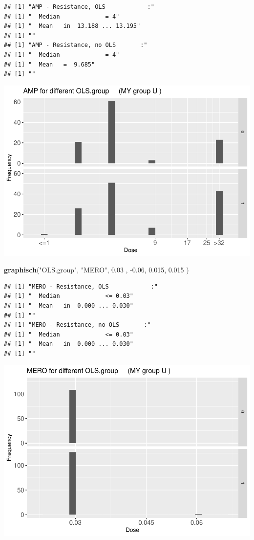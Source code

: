 \documentclass[
]{article}
\newenvironment{Shaded}{\begin{snugshade}}{\end{snugshade}}
\newcommand{\FloatTok}[1]{\textcolor[rgb]{0.00,0.00,0.81}{#1}}
\newcommand{\KeywordTok}[1]{\textcolor[rgb]{0.13,0.29,0.53}{\textbf{#1}}}
\newcommand{\NormalTok}[1]{#1}
\newcommand{\StringTok}[1]{\textcolor[rgb]{0.31,0.60,0.02}{#1}}
\begin{document}
\begin{verbatim}
## [1] "AMP - Resistance, OLS            :"
## [1] "  Median             = 4"
## [1] "  Mean   in  13.188 ... 13.195"
## [1] ""
## [1] "AMP - Resistance, no OLS       :"
## [1] "  Median             = 4"
## [1] "  Mean   =  9.685"
## [1] ""
\end{verbatim}

\includegraphics{Verteilungen_files/figure-latex/unnamed-chunk-18-1.pdf}

\begin{Shaded}
\begin{Highlighting}[]
  \KeywordTok{graphisch}\NormalTok{(}\StringTok{"OLS.group"}\NormalTok{, }\StringTok{"MERO"}\NormalTok{, }\FloatTok{0.03}\NormalTok{ ,  }\FloatTok{-0.06}\NormalTok{,   }\FloatTok{0.015}\NormalTok{,   }\FloatTok{0.015}\NormalTok{ )}
\end{Highlighting}
\end{Shaded}

\begin{verbatim}
## [1] "MERO - Resistance, OLS            :"
## [1] "  Median             <= 0.03"
## [1] "  Mean   in  0.000 ... 0.030"
## [1] ""
## [1] "MERO - Resistance, no OLS       :"
## [1] "  Median             <= 0.03"
## [1] "  Mean   in  0.000 ... 0.030"
## [1] ""
\end{verbatim}

\includegraphics{Verteilungen_files/figure-latex/unnamed-chunk-19-1.pdf}
\end{document}
